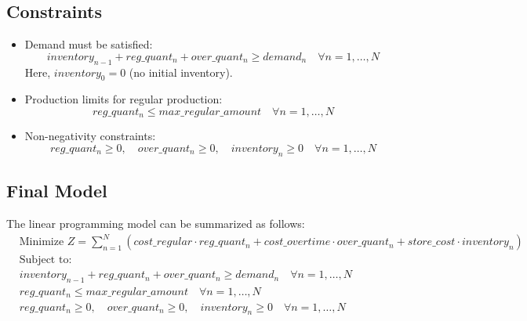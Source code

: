 \documentclass{article}
\begin{document}
\subsection*{Constraints}
\begin{itemize}
    \item Demand must be satisfied:
    \[
    inventory_{n-1} + reg\_quant_n + over\_quant_n \geq demand_n \quad \forall n = 1, \ldots, N
    \]
    Here, $inventory_0 = 0$ (no initial inventory).

    \item Production limits for regular production:
    \[
    reg\_quant_n \leq max\_regular\_amount \quad \forall n = 1, \ldots, N
    \]

    \item Non-negativity constraints:
    \[
    reg\_quant_n \geq 0, \quad over\_quant_n \geq 0, \quad inventory_n \geq 0 \quad \forall n = 1, \ldots, N
    \]
\end{itemize}

\subsection*{Final Model}
The linear programming model can be summarized as follows:
\begin{align*}
    & \text{Minimize } Z = \sum_{n=1}^{N} (cost\_regular \cdot reg\_quant_n + cost\_overtime \cdot over\_quant_n + store\_cost \cdot inventory_n) \\
    & \text{Subject to:} \\
    & inventory_{n-1} + reg\_quant_n + over\_quant_n \geq demand_n \quad \forall n = 1, \ldots, N \\
    & reg\_quant_n \leq max\_regular\_amount \quad \forall n = 1, \ldots, N \\
    & reg\_quant_n \geq 0, \quad over\_quant_n \geq 0, \quad inventory_n \geq 0 \quad \forall n = 1, \ldots, N
\end{align*}
\end{document}
